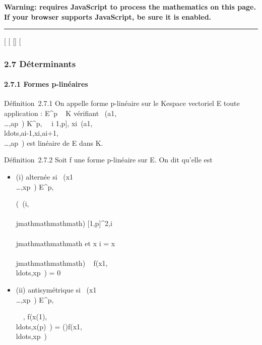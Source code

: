 \textbf{Warning: 
requires JavaScript to process the mathematics on this page.\\ If your
browser supports JavaScript, be sure it is enabled.}

\begin{center}\rule{3in}{0.4pt}\end{center}

{[}
{[}
{[}{]}
{[}

\subsubsection{2.7 Déterminants}

\paragraph{2.7.1 Formes p-linéaires}

Définition~2.7.1 On appelle forme p-linéaire sur le Kespace vectoriel E
toute application \phi : E^p \rightarrow~ K vérifiant
\forall~(a1,\\\ldots,ap~)
\in K^p, \forall~~i \in {[}1,p{]},
xi\mapsto~\phi(a1,\\ldots,ai-1,xi,ai+1,\\\ldots,ap~)
est linéaire de E dans K.

Définition~2.7.2 Soit f une forme p-linéaire sur E. On dit qu'elle est

\begin{itemize}
\item
  (i) alternée si
  \forall~(x1\\\ldots,xp~)
  \in E^p,

  \left (\exists~(i,\\\\jmathmathmathmath) \in
  {[}1,p{]}^2,i\neq~\\\\jmathmathmathmath\text
  et x i = x\\\\jmathmathmathmath\right ) \rigtharrow~
  f(x1,\\ldots,xp~)
  = 0
\item
  (ii) antisymétrique si
  \forall~(x1\\\ldots,xp~)
  \in E^p,

  \forall~\sigma \inSp~,
  f(x\sigma(1),\\ldots,x\sigma(p)~)
  =
  \epsilon(\sigma)f(x1,\\ldots,xp~)
\end{itemize}

